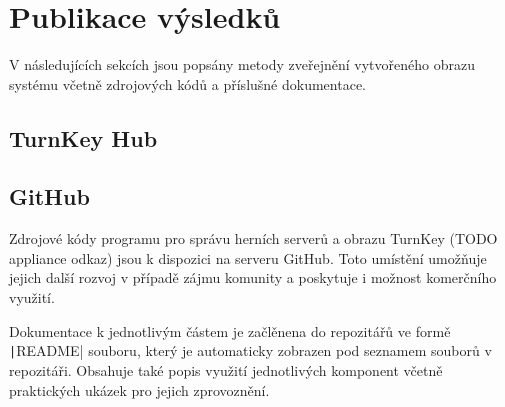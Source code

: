\chapter{Publikace výsledků}

V následujících sekcích jsou popsány metody zveřejnění vytvořeného obrazu systému včetně zdrojových kódů
a příslušné dokumentace.

\section{TurnKey Hub}

\section{GitHub}

Zdrojové kódy programu pro správu herních serverů \cite{github_linux_gameservers} a obrazu TurnKey (TODO appliance odkaz)
jsou k dispozici na serveru GitHub. Toto umístění umožňuje jejich další rozvoj v případě zájmu komunity a poskytuje i
možnost komerčního využití.

Dokumentace k jednotlivým částem je začlěnena do repozitářů ve formě \texttt|README| souboru, který je automaticky zobrazen
pod seznamem souborů v repozitáři. Obsahuje také popis využití jednotlivých komponent včetně praktických ukázek pro jejich zprovoznění.